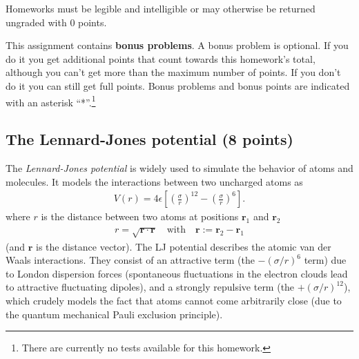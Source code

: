 \documentclass[paper=letter]{scrartcl}
\newcommand{\anumber}{7}
\renewcommand{\vec}[1]{\ensuremath{\mathbf{#1}}}
\newcommand{\anum}{0\anumber}
\begin{document}
Homeworks must be legible and intelligible or may otherwise be
returned ungraded with 0 points.

This assignment contains \textbf{bonus problems}. A bonus problem is
optional. If you do it you get additional points that count towards
this homework's total, although you can't get more than the maximum
number of points. If you don't do it you can still get full
points. Bonus problems and bonus points are indicated with an asterisk
``*''.\footnote{There are currently no tests available for this homework.}


\subsection{The Lennard-Jones potential (8 points)}
\label{sec:LJ}

The \emph{Lennard-Jones potential} is widely used to simulate the
behavior of atoms and molecules. It models the interactions between
two uncharged atoms as
\begin{gather}
  \label{eq:LJ}
  V(r) = 4\epsilon\left[\left(\frac{\sigma}{r}\right)^{12} - \left(\frac{\sigma}{r}\right)^{6}\right].
\end{gather}
where $r$ is the distance between two atoms at positions $\vec{r}_{1}$
and $\vec{r}_{2}$
\begin{gather}
  \label{eq:distance}
  r = \sqrt{\vec{r}\cdot\vec{r}} \quad\text{with}\quad \vec{r} :=
  \vec{r}_{2} - \vec{r}_{1}
\end{gather}
(and $\vec{r}$ is the distance vector).  The LJ potential describes
the atomic van der Waals interactions. They consist of an attractive
term (the $-(\sigma/r)^{6}$ term) due to London dispersion forces
(spontaneous fluctuations in the electron clouds lead to attractive
fluctuating dipoles), and a strongly repulsive term (the
$+(\sigma/r)^{12}$), which crudely models the fact that atoms cannot
come arbitrarily close (due to the quantum mechanical Pauli exclusion
principle).
\end{document}
